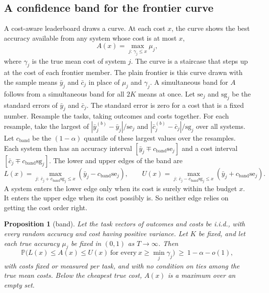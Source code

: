 \documentclass[11pt]{article}
\renewcommand{\Pr}{\mathbb{P}}
\newcommand{\se}{\mathrm{se}}
\newtheorem{proposition}{Proposition}
\begin{document}
\subsection{A confidence band for the frontier curve}
\label{sec:band}
A cost-aware leaderboard draws a curve. At each cost $x$, the curve shows the best accuracy available from any system whose cost is at most $x$,
\[
A(x)=\max_{j:\,\gamma_j\le x}\mu_j,
\]
where $\gamma_j$ is the true mean cost of system $j$. The curve is a staircase that steps up at the cost of each frontier member. The plain frontier is this curve drawn with the sample means $\bar y_j$ and $\bar c_j$ in place of $\mu_j$ and $\gamma_j$. A simultaneous band for $A$ follows from a simultaneous band for all $2K$ means at once. Let $\se_j$ and $\mathrm{sg}_j$ be the standard errors of $\bar y_j$ and $\bar c_j$. The standard error is zero for a cost that is a fixed number. Resample the tasks, taking outcomes and costs together. For each resample, take the largest of $|\bar y_j^{(b)}-\bar y_j|/\se_j$ and $|\bar c_j^{(b)}-\bar c_j|/\mathrm{sg}_j$ over all systems. Let $c_{\mathrm{band}}$ be the $(1-\alpha)$ quantile of these largest values over the resamples. Each system then has an accuracy interval $[\bar y_j\mp c_{\mathrm{band}}\se_j]$ and a cost interval $[\bar c_j\mp c_{\mathrm{band}}\mathrm{sg}_j]$. The lower and upper edges of the band are
\[
L(x)=\max_{j:\ \bar c_j+c_{\mathrm{band}}\mathrm{sg}_j\le x}(\bar y_j-c_{\mathrm{band}}\se_j),\qquad
U(x)=\max_{j:\ \bar c_j-c_{\mathrm{band}}\mathrm{sg}_j\le x}(\bar y_j+c_{\mathrm{band}}\se_j).
\]
A system enters the lower edge only when its cost is surely within the budget $x$. It enters the upper edge when its cost possibly is. So neither edge relies on getting the cost order right.
\begin{proposition}[band]
\label{prop:band}
Let the task vectors of outcomes and costs be i.i.d., with every random accuracy and cost having positive variance. Let $K$ be fixed, and let each true accuracy $\mu_j$ be fixed in $(0,1)$ as $T\to\infty$. Then
\[
\Pr\bigl(L(x)\le A(x)\le U(x)\ \text{for every}\ x\ge\min_j\gamma_j\bigr)\ \ge\ 1-\alpha-o(1),
\]
with costs fixed or measured per task, and with no condition on ties among the true mean costs. Below the cheapest true cost, $A(x)$ is a maximum over an empty set.
\end{proposition}
\end{document}
